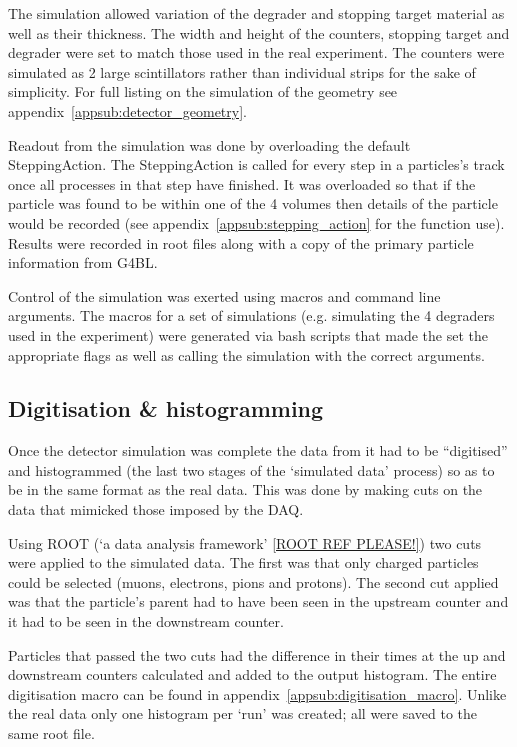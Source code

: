 \documentclass[]{article}
\begin{document}
The simulation allowed variation of the degrader and stopping target material as well as their thickness. The width and height of the counters, stopping target and degrader were set to match those used in the real experiment. The counters were simulated as 2 large scintillators rather than individual strips for the sake of simplicity. For full listing on the simulation of the geometry see appendix~\ref{appsub:detector_geometry}.

Readout from the simulation was done by overloading the default SteppingAction. The SteppingAction is called for every step in a particles's track once all processes in that step have finished. It was overloaded so that if the particle was found to be within one of the 4 volumes then details of the particle would be recorded (see appendix~\ref{appsub:stepping_action} for the function use). Results were recorded in root files along with a copy of the primary particle information from G4BL. 

Control of the simulation was exerted using macros and command line arguments. The macros for a set of simulations (e.g. simulating the 4 degraders used in the experiment) were generated via bash scripts that made the set the appropriate flags as well as calling the simulation with the correct arguments.
\subsection{Digitisation \& histogramming} %
\label{sub:digitisation_histogramming}
Once the detector simulation was complete the data from it had to be ``digitised'' and histogrammed (the last two stages of the `simulated data' process) so as to be in the same format as the real data. This was done by making cuts on the data that mimicked those imposed by the DAQ. 

Using ROOT (`a data analysis framework' \ref{ROOT REF PLEASE!}) two cuts were applied to the simulated data. The first was that only charged particles could be selected (muons, electrons, pions and protons). The second cut applied was that the particle's parent had to have been seen in the upstream counter and it had to be seen in the downstream counter. 

Particles that passed the two cuts had the difference in their times at the up and downstream counters calculated and added to the output histogram. The entire digitisation macro can be found in appendix~\ref{appsub:digitisation_macro}. Unlike the real data only one histogram per `run' was created; all were saved to the same root file.
\end{document}
